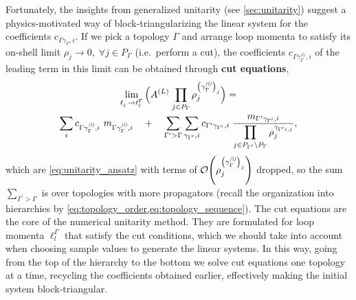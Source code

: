 {\def\gleading{{\gamma^{\textit{(l)}}_{\Gamma}}}
Fortunately, the insights from generalized unitarity (see \cref{sec:unitarity}) suggest
a physics-motivated way of block-triangularizing the linear system for the coefficients $c_{\Gamma\gamma_\Gamma, i}$.
If we pick a topology $\Gamma$ and arrange loop momenta to satisfy its on-shell limit $\rho_j \to 0,\;\forall j\in P_\Gamma$ (i.e.\ perform a cut),
the coefficients $c_{\Gamma\gleading,i}$ of the leading term in this limit
can be obtained through \textbf{cut equations},
\begin{multline} \label{eq:cut_equations}
  \lim_{\ell^{\phantom{\Gamma}}_l \to \ell_l^{\Gamma}}\qty\Big( A^{(L)} \; {\prod_{j\in P_\Gamma} \rho_j^{\qty(\gleading)_j}} ) =  \\
  \sum_i c_{\Gamma\gleading, i} ~ m_{\Gamma\gleading, i} \quad + \quad 
  \sum_{\Gamma^\prime > \Gamma} \sum_{\gamma_{\Gamma^\prime}, i} 
  c_{\Gamma^\prime\gamma_{\Gamma^\prime}, i} \;
  \frac{m_{\Gamma^\prime\gamma_{\Gamma^\prime}, i}}{\displaystyle \prod_{j\in P_{\Gamma^\prime} \setminus P_\Gamma} \rho_j^{\gamma_{\Gamma^\prime i, j}}},
\end{multline}
which are \cref{eq:unitarity_ansatz} with terms of $\order{\rho_j^{\qty(\gleading)_j}}$ dropped, so
the sum $\sum_{\Gamma^\prime > \Gamma}$ is over topologies with more propagators 
(recall the organization into hierarchies by \cref{eq:topology_order,eq:topology_sequence}).
The cut equations are the core of the numerical unitarity method.
They are formulated for loop momenta $\ell_l^{\Gamma}$ that satisfy the cut conditions,
which we should take into account when choosing sample values to generate the linear systems. 
In this way, going from the top of the hierarchy to the bottom
we solve cut equations one topology at a time, recycling the coefficients obtained earlier, effectively making the initial system block-triangular.

}
